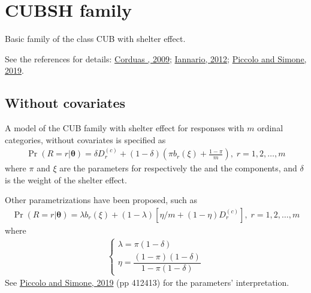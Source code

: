 \documentclass[letterpaper,10pt,english]{sphinxmanual}
\begin{document}
\noindent{}


\section{CUBSH family}
\label{\detokenize{manual:cubsh-family}}
\sphinxAtStartPar
Basic family of the class CUB with shelter effect.

\sphinxAtStartPar
See the references for details: \hyperlink{cite.references:id10}{Corduas , 2009};
\hyperlink{cite.references:id9}{Iannario, 2012};
\hyperlink{cite.references:id3}{Piccolo and Simone, 2019}.


\subsection{Without covariates}
\label{\detokenize{manual:cubsh-without-covariates}}\label{\detokenize{manual:id14}}
\sphinxAtStartPar
{}

\sphinxAtStartPar
A model of the CUB family with shelter effect
for responses with \(m\) ordinal categories, without covariates is specified as
\begin{equation*}
\begin{split}\Pr(R=r|\boldsymbol{\theta}) = \delta D_r^{(c)} + (1-\delta)\left(\pi b_r(\xi) + \frac{1-\pi}{m} \right)
,\; r=1,2,\ldots,m\end{split}
\end{equation*}
\sphinxAtStartPar
where \(\pi\) and \(\xi\) are the parameters for respectively the  and the
 components, and \(\delta\) is the weight of the shelter effect.

\sphinxAtStartPar
Other parametrizations have been proposed, such as
\begin{equation*}
\begin{split}\Pr(R=r|\boldsymbol{\theta}) = \lambda b_r(\xi) + (1-\lambda) \left[ \eta/m + (1-\eta) D_r^{(c)} \right]
,\; r=1,2,\ldots,m\end{split}
\end{equation*}
\sphinxAtStartPar
where
\begin{equation*}
\begin{split}\left\{
\begin{array}{l}
    \lambda = \pi(1-\delta)
    \\
    \eta = \dfrac{(1-\pi)(1-\delta)}{1 - \pi(1-\delta)}
\end{array}
\right.\end{split}
\end{equation*}
\sphinxAtStartPar
See \hyperlink{cite.references:id3}{Piccolo and Simone, 2019} (pp 412\sphinxhyphen{}413) for the parameters’ interpretation.
\end{document}

